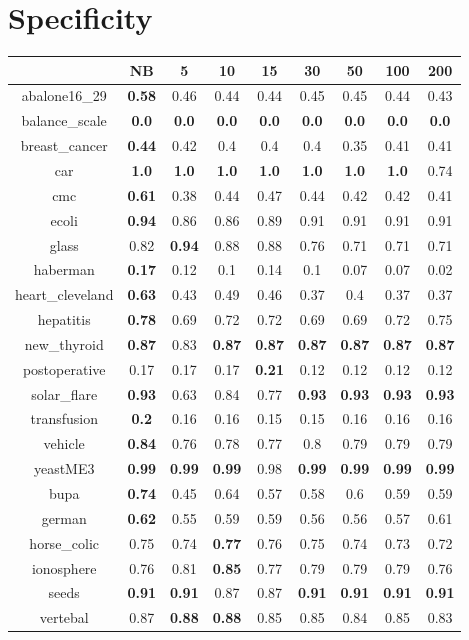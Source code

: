 \documentclass{article}%
\begin{document}
%
\section*{Specificity}%
\begin{tabular}{c|cccccccc}%
\hline%
&NB&5&10&15&30&50&100&200\\%
\hline%
abalone16\_29&\textbf{0.58}&0.46&0.44&0.44&0.45&0.45&0.44&0.43\\%
\hline%
balance\_scale&\textbf{0.0}&\textbf{0.0}&\textbf{0.0}&\textbf{0.0}&\textbf{0.0}&\textbf{0.0}&\textbf{0.0}&\textbf{0.0}\\%
\hline%
breast\_cancer&\textbf{0.44}&0.42&0.4&0.4&0.4&0.35&0.41&0.41\\%
\hline%
car&\textbf{1.0}&\textbf{1.0}&\textbf{1.0}&\textbf{1.0}&\textbf{1.0}&\textbf{1.0}&\textbf{1.0}&0.74\\%
\hline%
cmc&\textbf{0.61}&0.38&0.44&0.47&0.44&0.42&0.42&0.41\\%
\hline%
ecoli&\textbf{0.94}&0.86&0.86&0.89&0.91&0.91&0.91&0.91\\%
\hline%
glass&0.82&\textbf{0.94}&0.88&0.88&0.76&0.71&0.71&0.71\\%
\hline%
haberman&\textbf{0.17}&0.12&0.1&0.14&0.1&0.07&0.07&0.02\\%
\hline%
heart\_cleveland&\textbf{0.63}&0.43&0.49&0.46&0.37&0.4&0.37&0.37\\%
\hline%
hepatitis&\textbf{0.78}&0.69&0.72&0.72&0.69&0.69&0.72&0.75\\%
\hline%
new\_thyroid&\textbf{0.87}&0.83&\textbf{0.87}&\textbf{0.87}&\textbf{0.87}&\textbf{0.87}&\textbf{0.87}&\textbf{0.87}\\%
\hline%
postoperative&0.17&0.17&0.17&\textbf{0.21}&0.12&0.12&0.12&0.12\\%
\hline%
solar\_flare&\textbf{0.93}&0.63&0.84&0.77&\textbf{0.93}&\textbf{0.93}&\textbf{0.93}&\textbf{0.93}\\%
\hline%
transfusion&\textbf{0.2}&0.16&0.16&0.15&0.15&0.16&0.16&0.16\\%
\hline%
vehicle&\textbf{0.84}&0.76&0.78&0.77&0.8&0.79&0.79&0.79\\%
\hline%
yeastME3&\textbf{0.99}&\textbf{0.99}&\textbf{0.99}&0.98&\textbf{0.99}&\textbf{0.99}&\textbf{0.99}&\textbf{0.99}\\%
\hline%
bupa&\textbf{0.74}&0.45&0.64&0.57&0.58&0.6&0.59&0.59\\%
\hline%
german&\textbf{0.62}&0.55&0.59&0.59&0.56&0.56&0.57&0.61\\%
\hline%
horse\_colic&0.75&0.74&\textbf{0.77}&0.76&0.75&0.74&0.73&0.72\\%
\hline%
ionosphere&0.76&0.81&\textbf{0.85}&0.77&0.79&0.79&0.79&0.76\\%
\hline%
seeds&\textbf{0.91}&\textbf{0.91}&0.87&0.87&\textbf{0.91}&\textbf{0.91}&\textbf{0.91}&\textbf{0.91}\\%
\hline%
vertebal&0.87&\textbf{0.88}&\textbf{0.88}&0.85&0.85&0.84&0.85&0.83\\%
\hline%
\end{tabular}
\end{document}
